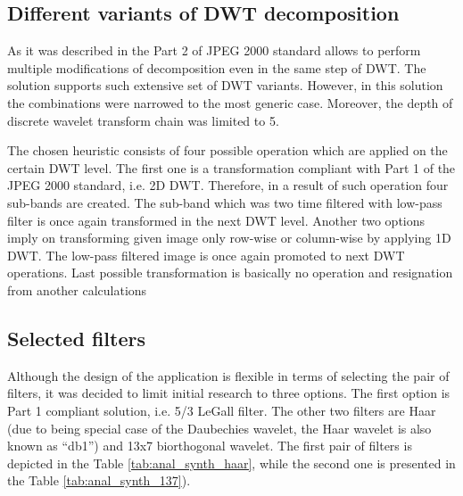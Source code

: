 \subsection{Different variants of DWT decomposition} \label{sec:dwt_decompositions}

As it was described in  the Part 2 of JPEG 2000 standard allows to perform
multiple modifications of decomposition even in the same step of DWT. The  solution supports
such extensive set of DWT variants. However, in this solution the combinations were narrowed to the most
generic case. Moreover, the depth of discrete wavelet transform chain was limited to 5.

The chosen heuristic consists of four possible operation which are applied on the certain DWT level.
The first one is a transformation compliant with Part 1 of the JPEG 2000 standard, i.e. 2D DWT. Therefore, in a result
of such operation four sub-bands are created. The sub-band which was two time filtered with low-pass filter
is once again transformed in the next DWT level. Another two options imply on transforming given image only
row-wise or column-wise by applying 1D DWT. The low-pass filtered image is once again promoted to next DWT operations.
Last possible transformation is basically no operation and resignation from another calculations

\subsection{Selected filters}

Although the design of the application is flexible in terms of selecting the pair of filters, it was decided
to limit initial research to three options. The first option is Part 1 compliant solution, i.e. 5/3 LeGall filter.
The other two filters are Haar (due to being special case of the Daubechies wavelet, the Haar wavelet is also
known as ``db1'') and 13x7 biorthogonal wavelet. The first pair of filters is depicted in the Table \ref{tab:anal_synth_haar},
while the second one is presented in the Table \ref{tab:anal_synth_137}).

